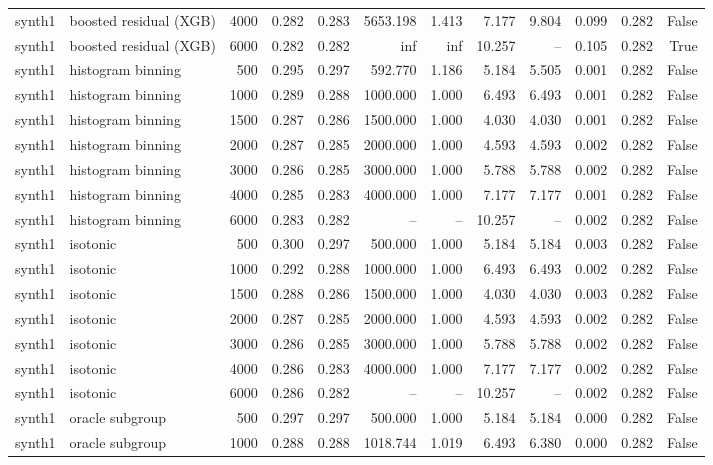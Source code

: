 \begin{tabular}{llrrrrrrrrrr}
synth1 & boosted residual (XGB) & 4000 & 0.282 & 0.283 & 5653.198 & 1.413 & 7.177 & 9.804 & 0.099 & 0.282 & False \\
synth1 & boosted residual (XGB) & 6000 & 0.282 & 0.282 & inf & inf & 10.257 & -- & 0.105 & 0.282 & True \\
synth1 & histogram binning & 500 & 0.295 & 0.297 & 592.770 & 1.186 & 5.184 & 5.505 & 0.001 & 0.282 & False \\
synth1 & histogram binning & 1000 & 0.289 & 0.288 & 1000.000 & 1.000 & 6.493 & 6.493 & 0.001 & 0.282 & False \\
synth1 & histogram binning & 1500 & 0.287 & 0.286 & 1500.000 & 1.000 & 4.030 & 4.030 & 0.001 & 0.282 & False \\
synth1 & histogram binning & 2000 & 0.287 & 0.285 & 2000.000 & 1.000 & 4.593 & 4.593 & 0.002 & 0.282 & False \\
synth1 & histogram binning & 3000 & 0.286 & 0.285 & 3000.000 & 1.000 & 5.788 & 5.788 & 0.002 & 0.282 & False \\
synth1 & histogram binning & 4000 & 0.285 & 0.283 & 4000.000 & 1.000 & 7.177 & 7.177 & 0.001 & 0.282 & False \\
synth1 & histogram binning & 6000 & 0.283 & 0.282 & -- & -- & 10.257 & -- & 0.002 & 0.282 & False \\
synth1 & isotonic & 500 & 0.300 & 0.297 & 500.000 & 1.000 & 5.184 & 5.184 & 0.003 & 0.282 & False \\
synth1 & isotonic & 1000 & 0.292 & 0.288 & 1000.000 & 1.000 & 6.493 & 6.493 & 0.002 & 0.282 & False \\
synth1 & isotonic & 1500 & 0.288 & 0.286 & 1500.000 & 1.000 & 4.030 & 4.030 & 0.003 & 0.282 & False \\
synth1 & isotonic & 2000 & 0.287 & 0.285 & 2000.000 & 1.000 & 4.593 & 4.593 & 0.002 & 0.282 & False \\
synth1 & isotonic & 3000 & 0.286 & 0.285 & 3000.000 & 1.000 & 5.788 & 5.788 & 0.002 & 0.282 & False \\
synth1 & isotonic & 4000 & 0.286 & 0.283 & 4000.000 & 1.000 & 7.177 & 7.177 & 0.002 & 0.282 & False \\
synth1 & isotonic & 6000 & 0.286 & 0.282 & -- & -- & 10.257 & -- & 0.002 & 0.282 & False \\
synth1 & oracle subgroup & 500 & 0.297 & 0.297 & 500.000 & 1.000 & 5.184 & 5.184 & 0.000 & 0.282 & False \\
synth1 & oracle subgroup & 1000 & 0.288 & 0.288 & 1018.744 & 1.019 & 6.493 & 6.380 & 0.000 & 0.282 & False \\

\end{tabular}
